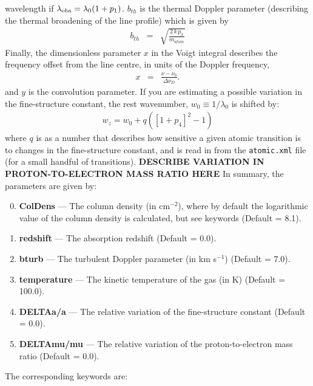 wavelength if $\lambda_{\rm obs}=\lambda_{0}(1+p_{1})$.
$b_{th}$ is the thermal Doppler parameter (describing the 
thermal broadening of the line profile) which is given by
\begin{eqnarray}
b_{th} & = & \sqrt{\frac{2\,k\,p_{3}}{m_{atom}}}
\end{eqnarray}
Finally, the dimensionless parameter $x$ in the Voigt integral
describes the frequency offset from the line centre, in units 
of the Doppler frequency,
\begin{eqnarray}
x & = & \frac{\nu-\nu_{0}}{\Delta\nu_{D}}.
\end{eqnarray}
and $y$ is the convolution parameter. If you are estimating a
possible variation in the fine-structure constant, the rest
wavenumber, $w_{0}\equiv1/\lambda_{0}$ is shifted by:
\begin{eqnarray}
w_{z} = w_{0} + q([1 + p_{4}]^{2} - 1)
\end{eqnarray}
where $q$ is as a number that describes how sensitive a given
atomic transition is to changes in the fine-structure constant, and
is read in from the \texttt{atomic.xml} file (for a small handful of
transitions).
\textbf{DESCRIBE VARIATION IN PROTON-TO-ELECTRON MASS RATIO HERE}
In summary, the parameters are given by:
\begin{enumerate}
\setcounter{enumi}{-1}
\item \textbf{ColDens} --- The column density (in cm$^{-2}$), where by default the logarithmic value of the column density is calculated, but see keywords (Default = 8.1).
\item \textbf{redshift} --- The absorption redshift (Default = 0.0).
\item \textbf{bturb} --- The turbulent Doppler parameter (in km s$^{-1}$) (Default = 7.0).
\item \textbf{temperature} --- The kinetic temperature of the gas (in K) (Default = 100.0).
\item \textbf{DELTAa/a} --- The relative variation of the fine-structure constant (Default = 0.0).
\item \textbf{DELTAmu/mu} --- The relative variation of the proton-to-electron mass ratio (Default = 0.0).
\end{enumerate}
The corresponding keywords are:

